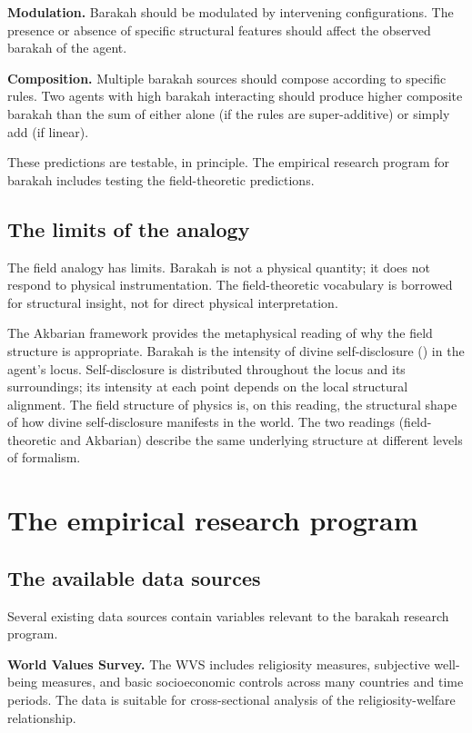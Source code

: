 \textbf{Modulation.} Barakah should be modulated by intervening
configurations. The presence or absence of specific structural
features should affect the observed barakah of the agent.

\textbf{Composition.} Multiple barakah sources should compose
according to specific rules. Two agents with high barakah
interacting should produce higher composite barakah than the sum
of either alone (if the rules are super-additive) or simply add
(if linear).

These predictions are testable, in principle. The empirical
research program for barakah includes testing the field-theoretic
predictions.

\subsection{The limits of the analogy}

The field analogy has limits. Barakah is not a physical quantity;
it does not respond to physical instrumentation. The
field-theoretic vocabulary is borrowed for structural insight,
not for direct physical interpretation.

The Akbarian framework provides the metaphysical reading of why
the field structure is appropriate. Barakah is the intensity of
divine self-disclosure () in the agent's locus.
Self-disclosure is distributed throughout the locus and its
surroundings; its intensity at each point depends on the local
structural alignment. The field structure of physics is, on this
reading, the structural shape of how divine self-disclosure
manifests in the world. The two readings (field-theoretic and
Akbarian) describe the same underlying structure at different
levels of formalism.

\section{The empirical research program}
\label{sec:bar-empirical}

\subsection{The available data sources}

Several existing data sources contain variables relevant to the
barakah research program.

\textbf{World Values Survey.} The WVS includes religiosity
measures, subjective well-being measures, and basic socioeconomic
controls across many countries and time periods. The data is
suitable for cross-sectional analysis of the religiosity-welfare
relationship.

